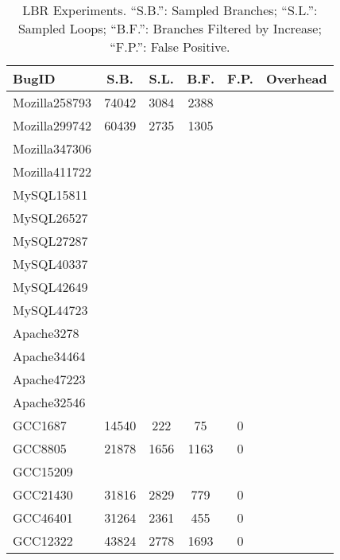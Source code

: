 \begin{table}[h!]
  \centering
  \small
  \begin{tabular}{lccccc}
    \toprule     
   {\bf BugID}             & {\bf S.B. } & {\bf S.L.}   & {\bf B.F.} & {\bf F.P.}  &{\bf Overhead} \\
    \midrule
    Mozilla258793          &  74042  &  3084  & 2388   &   & \\
    Mozilla299742          &  60439  &  2735  & 1305   &  & \\
    Mozilla347306          &    &  &    &  & \\
    Mozilla411722          &    &  &    &  & \\
    \midrule
    MySQL15811             &    &  &    &  & \\
    MySQL26527             &    &  &    &  & \\
    MySQL27287             &    &  &    &  & \\
    MySQL40337             &    &  &    &  & \\
    MySQL42649             &    &  &    &  & \\
    MySQL44723             &    &  &    &  & \\
    \midrule
    Apache3278             &    &  &    &  & \\
    Apache34464            &    &  &    &  & \\
    Apache47223            &    &  &    &  & \\
    Apache32546            &    &  &    &  & \\
    \midrule
    GCC1687                &  14540   & 222    &  75     & 0 & \\
    GCC8805                &  21878   & 1656   &  1163   & 0 & \\
    GCC15209               &     &        &         &  & \\
    GCC21430               &  31816   & 2829   &  779    & 0 & \\
    GCC46401               &  31264   & 2361   &  455    & 0 & \\
    GCC12322               &  43824   & 2778   &  1693   & 0 & \\
    \bottomrule
   \end{tabular}
  \nocaptionrule
  \caption{LBR Experiments. ``S.B.'': Sampled Branches; ``S.L.'': Sampled Loops; 
 ``B.F.'': Branches Filtered by Increase; ``F.P.'': False Positive.}
  \label{tab:LBR}
\end{table}


